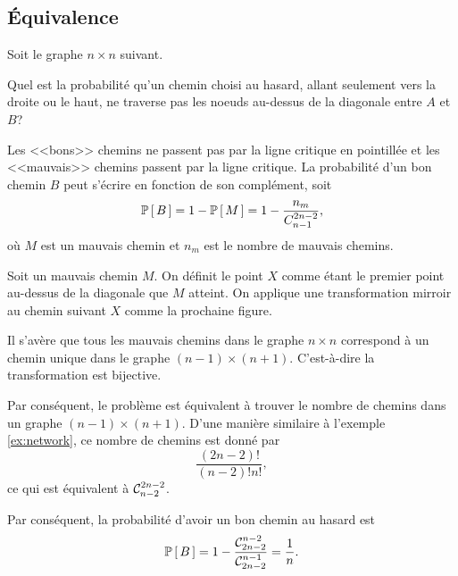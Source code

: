 \documentclass[11pt]{article}
\newcommand\comb[2]{%
	\ensuremath{%
		\mathcal{C}_{#2}^{#1}%
	}%
}%
\renewcommand\P[1]{%
	\ensuremath{%
		\mathbb{P}\left[\,#1\,\right]%
	}%
}%
\theoremstyle{remark}
\theoremstyle{definition}
\begin{document}
\subsection{Équivalence}
\begin{exemple}\label{ex:network_broken}
	Soit le graphe $n\times n$ suivant.
	\begin{figure}[H]
		\vspace{-3mm}
		\centering
		
		\vspace{-3mm}
	\end{figure}

	Quel est la probabilité qu'un chemin choisi au hasard, allant seulement
	vers la droite ou le haut, ne traverse pas les noeuds au-dessus de la
	diagonale entre $A$ et $B$?

	Les <<bons>> chemins ne passent pas par la ligne critique en pointillée et
	les <<mauvais>> chemins passent par la ligne critique. La probabilité d'un
	bon chemin $B$ peut s'écrire en fonction de son complément, soit
	\begin{equation*}
		\P{B}=1-\P{M}=1-\frac{n_m}{C_{n-1}^{2n-2}},
	\end{equation*}
	où $M$ est un mauvais chemin et $n_m$ est le nombre de mauvais chemins.

	Soit un mauvais chemin $M$. On définit le point $X$ comme étant le premier
	point au-dessus de la diagonale que $M$ atteint. On applique une
	transformation mirroir au chemin suivant $X$ comme la prochaine figure.

	\noindent
	\begin{minipage}{0.5\textwidth}
		\begin{figure}[H]
			\centering
			
		\end{figure}
	\end{minipage}%
	\begin{minipage}{0.5\textwidth}
		\begin{figure}[H]
			\centering
			
		\end{figure}
	\end{minipage}
\end{exemple}
\addtocounter{exemple}{-1}
\begin{exemple}[suite]
	Il s'avère que tous les mauvais chemins dans le graphe $n\times n$
	correspond à un chemin unique dans le graphe $(n-1)\times(n+1)$.
	C'est-à-dire la transformation est bijective.
	
	Par conséquent, le problème est équivalent à trouver le nombre de chemins
	dans un graphe $(n-1)\times(n+1)$. D'une manière similaire à l'exemple
	\ref{ex:network}, ce nombre de chemins est donné par
	\begin{equation*}
		\frac{(2n-2)!}{(n-2)!n!},
	\end{equation*}
	ce qui est équivalent à $\comb{2n-2}{n-2}$.

	Par conséquent, la probabilité d'avoir un bon chemin au hasard est
	\begin{equation*}
		\P{B}
		=1-\frac{\comb{n-2}{2n-2}}{\comb{n-1}{2n-2}}
		=\frac{1}{n}.
	\end{equation*}
\end{exemple}
\end{document}
